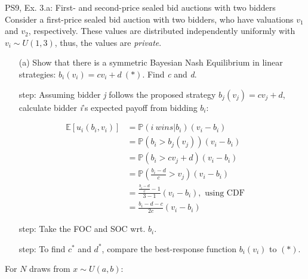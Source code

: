 \begin{frame}{PS9, Ex. 3.a: First- and second-price sealed bid auctions with two bidders}
    Consider a first-price sealed bid auction with two bidders, who have valuations $v_1$ and $v_2$, respectively. These values are distributed independently uniformly with $v_i\sim U(1,3)$, thus, the values are \textit{private}.
    \vspace{-4pt}
    \begin{itemize}
      \item[(a)] Show that there is a symmetric Bayesian Nash Equilibrium in linear strategies: $b_i(v_i) = cv_i + d\ (*)$. Find \textit{c} and \textit{d}.
    \end{itemize}
    \vspace{-8pt}
    \begin{multicols}{2}
      \begin{itemize}
        \item[\nth{1} step:] Assuming bidder \textit{j} follows the proposed strategy $b_j(v_j) = cv_j + d$, calculate bidder \textit{i}'s expected payoff from bidding $b_i$:
      \end{itemize}\vspace{-20pt}
      \begin{align*}
          \mathbb{E}[u_i(b_i,v_i)]&=\mathbb{P}(i\ wins|b_i)(v_i-b_i)\\
                                  &=\mathbb{P}(b_i>b_j(v_j))(v_i-b_i)\\
                                  &=\mathbb{P}(b_i>cv_j+d)(v_i-b_i)\\
                                  &=\mathbb{P}\left(\frac{b_i-d}{c}>v_j\right)(v_i-b_i)\\
                                  &=\frac{\frac{b_i-d}{c}-1}{3-1}(v_i-b_i),\text{ using CDF}\\
                                  &=\frac{b_i-d-c}{2c}(v_i-b_i)
      \end{align*}\vspace{-22pt}
      \begin{itemize}
        \item[\nth{2} step:] Take the FOC and SOC wrt. $b_i$.
        \item[\nth{3} step:] \vspace{-2pt}To find $c^*$ and $d^*$, compare the best-response function $b_i(v_i)$ to $(*)$.
      \end{itemize}
      \vfill\null\columnbreak
      For $N$ draws from $x\sim U(a, b):$
      \vspace{-6pt}

\end{multicols}
\end{frame}
